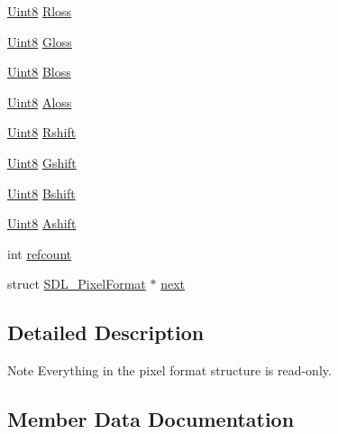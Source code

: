 \begin{DoxyCompactItemize}
\item 
\mbox{\hyperlink{_s_d_l__stdinc_8h_a2944638813a090aa23e62f4da842c3e2}{Uint8}} \mbox{\hyperlink{struct_s_d_l___pixel_format_a9994b4ed87a2551253aebfa191db8424}{Rloss}}
\item 
\mbox{\hyperlink{_s_d_l__stdinc_8h_a2944638813a090aa23e62f4da842c3e2}{Uint8}} \mbox{\hyperlink{struct_s_d_l___pixel_format_a94469768d8436e631a13d68623ff663f}{Gloss}}
\item 
\mbox{\hyperlink{_s_d_l__stdinc_8h_a2944638813a090aa23e62f4da842c3e2}{Uint8}} \mbox{\hyperlink{struct_s_d_l___pixel_format_a337072c1bc8b41efdd2da4e95b8c2ff7}{Bloss}}
\item 
\mbox{\hyperlink{_s_d_l__stdinc_8h_a2944638813a090aa23e62f4da842c3e2}{Uint8}} \mbox{\hyperlink{struct_s_d_l___pixel_format_a660e95097874088292f1289a458efaa2}{Aloss}}
\item 
\mbox{\hyperlink{_s_d_l__stdinc_8h_a2944638813a090aa23e62f4da842c3e2}{Uint8}} \mbox{\hyperlink{struct_s_d_l___pixel_format_abfdec7b9ee2ee39db630f4022e4e0daa}{Rshift}}
\item 
\mbox{\hyperlink{_s_d_l__stdinc_8h_a2944638813a090aa23e62f4da842c3e2}{Uint8}} \mbox{\hyperlink{struct_s_d_l___pixel_format_a6045012f994c02a86bdc4a91b28d2a3c}{Gshift}}
\item 
\mbox{\hyperlink{_s_d_l__stdinc_8h_a2944638813a090aa23e62f4da842c3e2}{Uint8}} \mbox{\hyperlink{struct_s_d_l___pixel_format_a4212574b67529628d8822ed4eb109754}{Bshift}}
\item 
\mbox{\hyperlink{_s_d_l__stdinc_8h_a2944638813a090aa23e62f4da842c3e2}{Uint8}} \mbox{\hyperlink{struct_s_d_l___pixel_format_ac3c4ffa0de1f2c94040340deede3bf46}{Ashift}}
\item 
int \mbox{\hyperlink{struct_s_d_l___pixel_format_a23be8060443d58064a720a4e2ef31729}{refcount}}
\item 
struct \mbox{\hyperlink{struct_s_d_l___pixel_format}{S\+D\+L\+\_\+\+Pixel\+Format}} $\ast$ \mbox{\hyperlink{struct_s_d_l___pixel_format_a1953b66c817116bf81bae4873ee6bce5}{next}}
\end{DoxyCompactItemize}


\subsection{Detailed Description}
\begin{DoxyNote}{Note}
Everything in the pixel format structure is read-\/only. 
\end{DoxyNote}


\subsection{Member Data Documentation}
\mbox{\label{struct_s_d_l___pixel_format_a660e95097874088292f1289a458efaa2}} 
